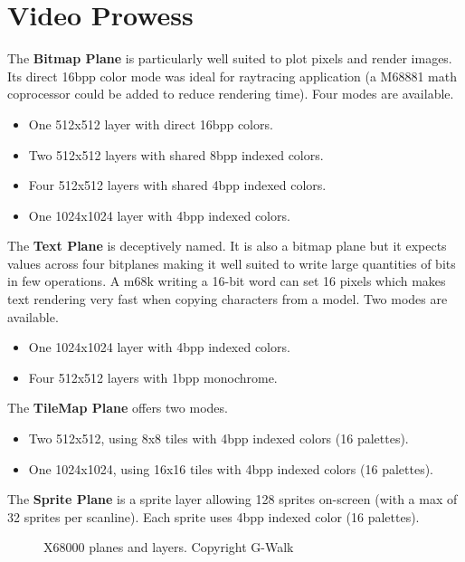 \section{Video Prowess}

The \textbf{Bitmap Plane} is particularly well suited to plot pixels and render images. Its direct 16bpp color mode was ideal for raytracing application (a M68881 math coprocessor could be added to reduce rendering time). Four modes are available.


\begin{itemize}[topsep=0pt]
\item One 512x512 layer with direct 16bpp colors.
\item Two 512x512 layers with shared 8bpp indexed colors.
\item Four 512x512 layers with shared 4bpp indexed colors.
\item One 1024x1024 layer with 4bpp indexed colors.
\end{itemize}

The \textbf{Text Plane} is deceptively named. It is also a bitmap plane but it expects values across four bitplanes making it well suited to write large quantities of bits in few operations. A m68k writing a 16-bit word can set 16 pixels which makes text rendering very fast when copying characters from a model. Two modes are available.

\begin{itemize}[topsep=0pt]
\item One 1024x1024 layer with 4bpp indexed colors.
\item Four 512x512 layers with 1bpp monochrome.
\end{itemize}


The \textbf{TileMap Plane} offers two modes.
\begin{itemize}[topsep=0pt]
\item Two 512x512, using 8x8 tiles with 4bpp indexed colors (16 palettes).
\item One 1024x1024, using 16x16 tiles with 4bpp indexed colors (16 palettes).
\end{itemize}

The \textbf{Sprite Plane} is a sprite layer allowing 128 sprites on-screen (with a max of 32 sprites per scanline). Each sprite uses 4bpp indexed color (16 palettes).


 \begin{figure}[H]
\caption*{X68000 planes and layers. Copyright G-Walk\cite{x68k_perfect_catalogue}}
\end{figure}



